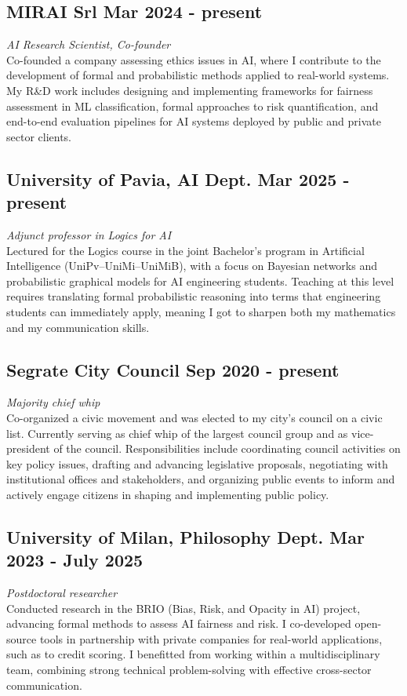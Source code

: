 \documentclass[a4paper,10pt]{article}
\begin{document}
\subsection*{MIRAI Srl \hfill Mar 2024 - present}
\textit{AI Research Scientist, Co-founder} \\
Co-founded a company assessing ethics issues in AI, where I contribute to the development of formal and probabilistic methods applied to real-world systems. My R\&D work includes designing and implementing frameworks for fairness assessment in ML classification, formal approaches to risk quantification, and end-to-end evaluation pipelines for AI systems deployed by public and private sector clients.

\subsection*{University of Pavia, AI Dept. \hfill Mar 2025 - present}
\textit{Adjunct professor in Logics for AI} \\
Lectured for the Logics course in the joint Bachelor’s program in Artificial Intelligence (UniPv--UniMi--UniMiB), with a focus on Bayesian networks and probabilistic graphical models for AI engineering students. Teaching at this level requires translating formal probabilistic reasoning into terms that engineering students can immediately apply, meaning I got to sharpen both my mathematics and my communication skills.

\subsection*{Segrate City Council \hfill Sep 2020 - present}
\textit{Majority chief whip} \\
Co-organized a civic movement and was elected to my city’s council on a civic list. Currently serving as chief whip of the largest council group and as vice-president of the council. Responsibilities include coordinating council activities on key policy issues, drafting and advancing legislative proposals, negotiating with institutional offices and stakeholders, and organizing public events to inform and actively engage citizens in shaping and implementing public policy.

\subsection*{University of Milan, Philosophy Dept. \hfill Mar 2023 - July 2025}
\textit{Postdoctoral researcher} \\
Conducted research in the BRIO (Bias, Risk, and Opacity in AI) project, advancing formal methods to assess AI fairness and risk. I co-developed open-source tools in partnership with private companies for real-world applications, such as to credit scoring. I benefitted from working within a multidisciplinary team, combining strong technical problem-solving with effective cross-sector communication.
\end{document}
